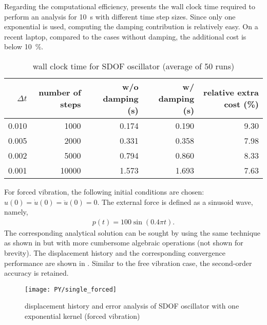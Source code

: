 Regarding the computational efficiency,  presents the wall clock time required to perform an analysis for \SI{10}{\second} with different time step sizes.
Since only one exponential is used, computing the damping contribution is relatively easy. On a recent laptop, compared to the cases without damping, the additional cost is below \SI{10}{\percent}.
\begin{table}[H]
\centering\footnotesize
\caption{wall clock time for SDOF oscillator (average of \num{50} runs)}\label{tab:sdof_cost}
\begin{tabular}{rrrrr}
    \toprule
    $\Delta{}t$ & number of steps & w/o damping (\si{\second}) & w/ damping (\si{\second}) & relative extra cost (\%) \\ \midrule
    \num{0.010} &      \num{1000} &                \num{0.174} &               \num{0.190} &               \num{9.30} \\
    \num{0.005} &      \num{2000} &                \num{0.331} &               \num{0.358} &               \num{7.98} \\
    \num{0.002} &      \num{5000} &                \num{0.794} &               \num{0.860} &               \num{8.33} \\
    \num{0.001} &     \num{10000} &                \num{1.573} &               \num{1.693} &               \num{7.63} \\ \bottomrule
\end{tabular}
\end{table}

For forced vibration, the following initial conditions are chosen: $u\left(0\right)=\dot{u}\left(0\right)=\ddot{u}\left(0\right)=0$. The external force is defined as a sinusoid wave, namely,
\begin{gather}
p\left(t\right)=100\sin\left(0.4\pi{}t\right).
\end{gather}
The corresponding analytical solution can be sought by using the same technique as shown in  but with more cumbersome algebraic operations (not shown for brevity). The displacement history and the corresponding convergence performance are shown in . Similar to the free vibration case, the second-order accuracy is retained.
\begin{figure}[H]
\centering
\texttt{[image: PY/single\_forced]}
\caption{displacement history and error analysis of SDOF oscillator with one exponential kernel (forced vibration)}\label{fig:sdof_forced}
\end{figure}

